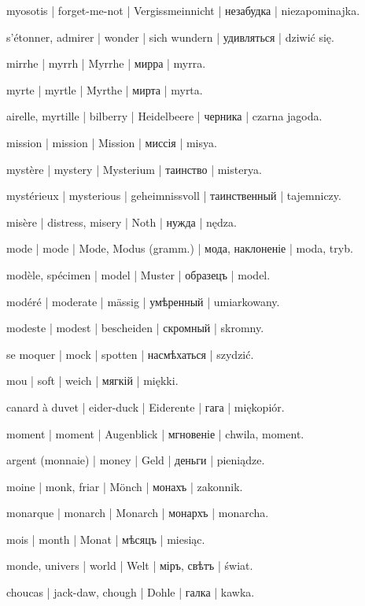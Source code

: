 \begin{outdent}{1em}
myosotis | forget-me-not | Vergissmeinnicht | незабудка | niezapominajka.

s’étonner, admirer | wonder | sich wundern | удивляться | dziwić się.

mirrhe | myrrh | Myrrhe | мирра | myrra.

myrte | myrtle | Myrthe | мирта | myrta.

airelle, myrtille | bilberry | Heidelbeere | черника | czarna jagoda.

mission | mission | Mission | миссія | misya.

mystère | mystery | Mysterium | таинство | misterya.

\uvsubentry{}
mystérieux | mysterious | geheimnissvoll | таинственный | tajemniczy.

misère | distress, misery | Noth | нужда | nędza.

mode | mode | Mode, Modus (gramm.) | мода, наклоненіе | moda, tryb.

modèle, spécimen | model | Muster | образецъ | model.

modéré | moderate | mässig | умѣренный | umiarkowany.

modeste | modest | bescheiden | скромный | skromny.

se moquer | mock | spotten | насмѣхаться | szydzić.

mou | soft | weich | мягкій | miękki.

\uvsubentry{}
canard à duvet | eider-duck | Eiderente | гага | miękopiór.

moment | moment | Augenblick | мгновеніе | chwila, moment.

argent (monnaie) | money | Geld | деньги | pieniądze.

moine | monk, friar | Mönch | монахъ | zakonnik.

monarque | monarch | Monarch | монархъ | monarcha.

mois | month | Monat | мѣсяцъ | miesiąc.

monde, univers | world | Welt | міръ, свѣтъ | świat.

choucas | jack-daw, chough | Dohle | галка | kawka.


\end{outdent}
